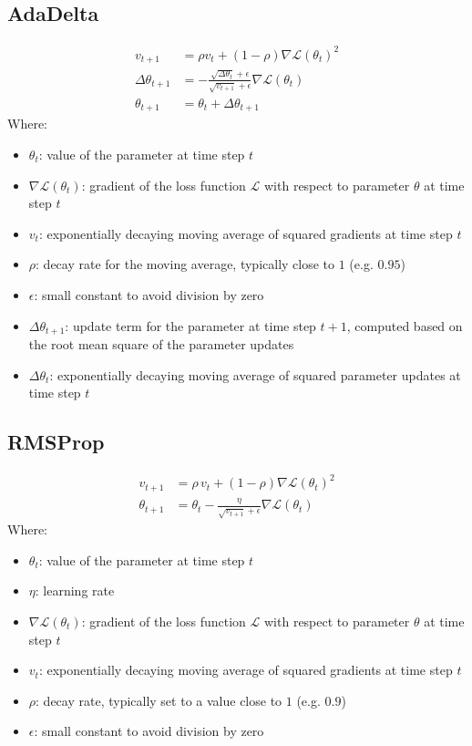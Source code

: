 \documentclass[a4paper]{article}
\newcommand{\ELL}{\mathcal{L}}
\begin{document}
\subsection*{AdaDelta}
\begin{align*}
    v_{t+1} &= \rho v_t + (1-\rho)\nabla\ELL(\theta_t)^2 \\
    \Delta\theta_{t+1} &= -\frac{\sqrt{\Delta\theta_t}+\epsilon}{\sqrt{v_{t+1}}+\epsilon} \nabla\ELL(\theta_t) \\
    \theta_{t+1} &= \theta_t + \Delta\theta_{t+1}
\end{align*}
Where:
\begin{itemize}
    \item $\theta_t$: value of the parameter at time step $t$
    \item $\nabla\ELL(\theta_t)$: gradient of the loss function $\ELL$ with respect to parameter $\theta$ at time step $t$
    \item $v_t$: exponentially decaying moving average of squared gradients at time step $t$
    \item $\rho$: decay rate for the moving average, typically close to $1$ (e.g. $0.95$)
    \item $\epsilon$: small constant to avoid division by zero
    \item $\Delta\theta_{t+1}$: update term for the parameter at time step $t+1$, computed based on the root mean square of the parameter updates
    \item $\Delta\theta_{t}$: exponentially decaying moving average of squared parameter updates at time step $t$
\end{itemize}

\subsection*{RMSProp}
\begin{align*}
    v_{t+1} &= \rho \, v_{t} + (1-\rho) {\nabla\ELL(\theta_t)}^2 \\
    \theta_{t+1} &= \theta_{t} - \frac{\eta}{\sqrt{v_{t+1}} + \epsilon} \nabla\ELL(\theta_t)
\end{align*}
Where:
\begin{itemize}
    \item $\theta_t$: value of the parameter at time step $t$
    \item $\eta$: learning rate
    \item $\nabla\ELL(\theta_t)$: gradient of the loss function $\ELL$ with respect to parameter $\theta$ at time step $t$
    \item $v_t$: exponentially decaying moving average of squared gradients at time step $t$
    \item $\rho$: decay rate, typically set to a value close to $1$ (e.g. $0.9$)
    \item $\epsilon$: small constant to avoid division by zero
\end{itemize}
\end{document}
